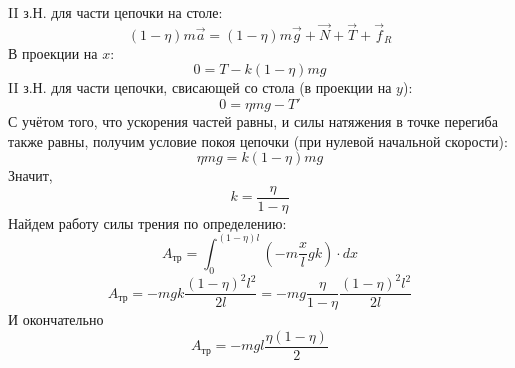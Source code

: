 \documentclass[a5paper,10pt]{article}
\begin{document}
II з.Н. для части цепочки на столе:
\begin{equation}
    (1-\eta)m\vec{a}=(1-\eta)m\vec{g}+\vec{N}+\vec{T}+\vec{f}_R
\end{equation}
В проекции на $x$:
\begin{equation}
    0=T-k(1-\eta)mg
\end{equation}
II з.Н. для части цепочки, свисающей со стола (в проекции на $y$):
\begin{equation}
    0=\eta mg-T'
\end{equation}
С учётом того, что ускорения частей равны, и силы натяжения в точке перегиба также равны, получим условие покоя цепочки (при нулевой начальной скорости):
\begin{equation}
    \eta mg=k(1-\eta)mg
\end{equation}
Значит,
\begin{equation}
    k=\frac{\eta}{1-\eta}
\end{equation}
Найдем работу силы трения по определению:
\begin{equation}
    A_\text{тр}=\int_{0}^{(1-\eta)l}(-m\frac{x}{l}g{k})\cdot{dx}
\end{equation}
\begin{equation}
    A_\text{тр}=-mg{k}\frac{(1-\eta)^2l^2}{2l}=
    -mg\frac{\eta}{1-\eta}\frac{(1-\eta)^2l^2}{2l}
\end{equation}
И окончательно
\begin{equation}
    A_\text{тр}=-mgl\frac{\eta(1-\eta)}{2}
\end{equation}
\end{document}
